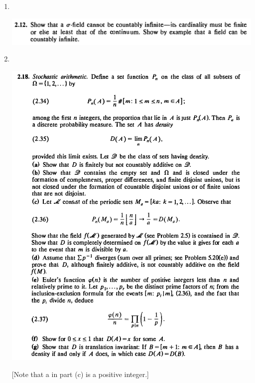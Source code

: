 \begin{enumerate}
\begin{enumerate}[label=(\alph*)]
\begin{proof}
    \end{proof}
  \end{enumerate}

\newpage
\item~\\
  \begin{mdframed}
    \includegraphics[width=400pt]{img/analysis--berkeley-202a-hw-af2a.png}
  \end{mdframed}

\newpage
\item~\\
  \begin{mdframed}
    \includegraphics[width=400pt]{img/analysis--berkeley-202a-hw-b476.png}
  \end{mdframed}
  [Note that a in part (c) is a positive integer.]

\end{enumerate}